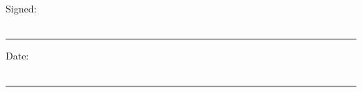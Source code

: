 \noindent Signed:\\\\

\rule[0.5em]{25em}{0.5pt} %
 
\noindent Date:\\\\

\rule[0.5em]{25em}{0.5pt} %

 
 

